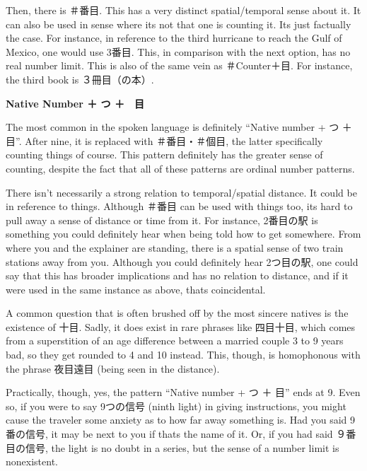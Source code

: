 \par{ Then, there is ＃番目. This has a very distinct spatial\slash temporal sense about it. It can also be used in sense where it\textquotesingle s not that one is counting it. It\textquotesingle s just factually the case. For instance, in reference to the third hurricane to reach the Gulf of Mexico, one would use 3番目. This, in comparison with the next option, has no real number limit. This is also of the same vein as ＃Counter＋目. For instance, the third book is ３冊目（の本）. }

\begin{center}
 \textbf{Native Number ＋ つ ＋　目 }
\end{center}

\par{ The most common in the spoken language is definitely “Native number + つ ＋ 目”. After nine, it is replaced with ＃番目・＃個目, the latter specifically counting things of course. \hfill\break
This pattern definitely has the greater sense of counting, despite the fact that all of these patterns are ordinal number patterns. }

\par{ There isn't necessarily a strong relation to temporal\slash spatial distance. It could be in reference to things. Although ＃番目 can be used with things too, it\textquotesingle s hard to pull away a sense of distance or time from it. For instance, 2番目の駅 is something you could definitely hear when being told how to get somewhere. From where you and the explainer are standing, there is a spatial sense of two train stations away from you. Although you could definitely hear 2つ目の駅, one could say that this has broader implications and has no relation to distance, and if it were used in the same instance as above, that\textquotesingle s coincidental. }

\par{ A common question that is often brushed off by the most sincere natives is the existence of 十目. Sadly, it does exist in rare phrases like 四目十目, which comes from a superstition of an age difference between a married couple 3 to 9 years bad, so they get rounded to 4 and 10 instead. This, though, is homophonous with the phrase 夜目遠目 (being seen in the distance). }

\par{ Practically, though, yes, the pattern “Native number + つ ＋ 目” ends at 9. Even so, if you were to say 9つの信号 (ninth light) in giving instructions, you might cause the traveler some anxiety as to how far away something is. Had you said 9番の信号, it may be next to you if that\textquotesingle s the name of it. Or, if you had said ９番目の信号, the light is no doubt in a series, but the sense of a number limit is nonexistent. }


